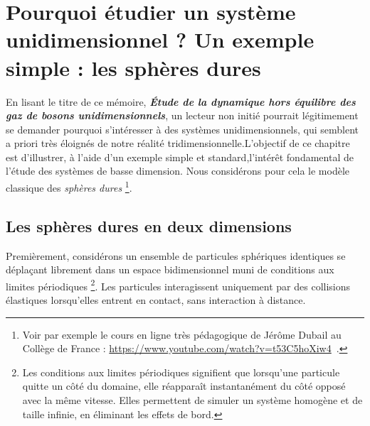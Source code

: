 

\chapter{Pourquoi étudier un système unidimensionnel ?  Un exemple simple : les sphères dures}
\minitoc[n] %

En lisant le titre de ce mémoire,
\emph{\textbf{Étude de la dynamique hors équilibre des gaz de bosons unidimensionnels}}, un lecteur non initié pourrait légitimement se demander pourquoi s’intéresser à des systèmes unidimensionnels, qui semblent a priori très éloignés de notre réalité tridimensionnelle.L’objectif de ce chapitre est d’illustrer, à l’aide d’un exemple simple et standard,l’intérêt fondamental de l’étude des systèmes de basse dimension.
Nous considérons pour cela le modèle classique des \emph{sphères dures} \footnote{Voir par exemple le cours en ligne très pédagogique de Jérôme Dubail au Collège de France : \url{https://www.youtube.com/watch?v=t53C5hoXiw4}~\cite{Dubail2025SolitonsOndes}.}.

\section*{Les sphères dures en deux dimensions}

Premièrement, considérons un ensemble de particules sphériques identiques se déplaçant librement dans un espace bidimensionnel muni de conditions aux limites périodiques \footnote{Les conditions aux limites périodiques signifient que lorsqu’une particule quitte un côté du domaine, elle réapparaît instantanément du côté opposé avec la même vitesse. Elles permettent de simuler un système homogène et de taille infinie, en éliminant les effets de bord.}. Les particules interagissent uniquement par des collisions élastiques lorsqu’elles entrent en contact, sans interaction à distance.

